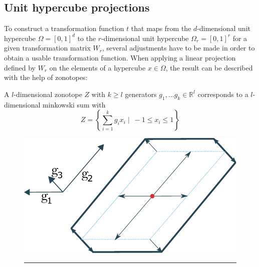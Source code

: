 \documentclass[
  a4paper,  %
  twoside,  %
  bibliography=totoc,
  headsepline,
  cleardoublepage=empty,
  parskip=half,
  draft=false
]{scrbook}
\newcommand{\delimit}{{\color{charcoal}\noindent\rule{\textwidth}{1pt}}}
\begin{document}
\subsection{Unit hypercube projections}

To construct a transformation function $t$ that maps from the $d$-dimensional unit hypercube $\Omega=[0,1]^d$ to the $r$-dimensional unit hypercube $\Omega_r=[0,1]^r$ for a given transformation matrix $W_r$, several adjustments have to be made in order to obtain a usable transformation function.
When applying a linear projection defined by $W_r$ on the elements of a hypercube $x \in \Omega$, the result can be described with the help of zonotopes:

\begin{definition}[Zonotope]
A $l$-dimensional zonotope $Z$ with $k \geq l$ generators $g_1, \dots g_k \in \mathds{R}^l$ corresponds to a $l$-dimensional minkowski sum with 
\begin{equation}
Z=\left\{\sum_{i=1}^k g_i x_i \mid ~ -1 \leq x_i \leq 1\right\}
  \label{zonotope}
\end{equation}
\end{definition}


\begin{mdframed}[style=style]
\begin{figure}[H]
\centering
  \includegraphics[width=0.5\linewidth]{graphics/zonotope}
  \delimit
  \label{fig:zonotope}
\end{figure}
\end{mdframed}
\end{document}
